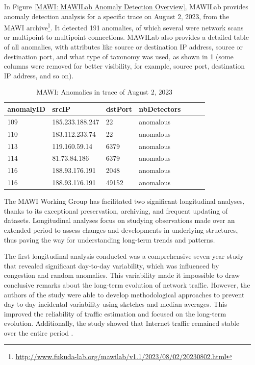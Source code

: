 \documentclass[sigconf,authorversion,nonacm]{acmart}
\begin{document}
In Figure \ref{MAWI: MAWILab Anomaly Detection Overview}, MAWILab provides anomaly detection analysis for a specific trace on August 2, 2023, from the MAWI archive\footnote{\url{http://www.fukuda-lab.org/mawilab/v1.1/2023/08/02/20230802.html}}. It detected 191 anomalies, of which several were network scans or multipoint-to-multipoint connections. MAWILab also provides a detailed table of all anomalies, with attributes like source or destination IP address, source or destination port, and what type of taxonomy was used, as shown in \ref{anomaly} (some columns were removed for better visibility, for example, source port, destination IP address, and so on).

\begin{table}[!ht]
    \centering
    \caption{MAWI: Anomalies in trace of August 2, 2023}
    \label{anomaly}
    \begin{tabular}{|l|l|l|l|l|l|l|}
    \hline
        anomalyID &  srcIP & dstPort & nbDetectors \\ \hline
        109 & 185.233.188.247 & 22 & anomalous \\ \hline
        110 & 183.112.233.74 & 22 & anomalous \\ \hline
        113 & 119.160.59.14 & 6379 & anomalous \\ \hline
        114 & 81.73.84.186 & 6379 & anomalous \\ \hline
        116 & 188.93.176.191 & 2048 & anomalous \\ \hline
        116 & 188.93.176.191 & 49152 & anomalous \\ \hline
    \end{tabular}
\end{table}

The MAWI Working Group has facilitated two significant longitudinal analyses, thanks to its exceptional preservation, archiving, and frequent updating of datasets. Longitudinal analyses focus on studying observations made over an extended period to assess changes and developments in underlying structures, thus paving the way for understanding long-term trends and patterns.

The first longitudinal analysis conducted was a comprehensive seven-year study that revealed significant day-to-day variability, which was influenced by congestion and random anomalies. This variability made it impossible to draw conclusive remarks about the long-term evolution of network traffic. However, the authors of the study were able to develop methodological approaches to prevent day-to-day incidental variability using sketches and median averages. This improved the reliability of traffic estimation and focused on the long-term evolution. Additionally, the study showed that Internet traffic remained stable over the entire period \cite{5061979}.
\end{document}
